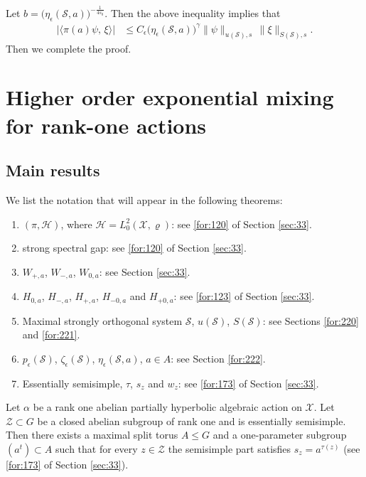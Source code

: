 \documentclass[11 pt]{amsart}
\newcommand{\norm}[1]{\lVert#1\rVert}
\theoremstyle{definition}
\numberwithin{equation}{section}
\begin{document}
Let $b=\big(\eta_\epsilon(\mathcal{S}, a)\big)^{-\frac{1}{4s_0}}$. Then the above inequality implies that
\begin{align*}
 \big|\langle \pi(a)\psi,\, \xi\rangle\big|&\leq C_\epsilon \big(\eta_\epsilon(\mathcal{S}, a)\big)^\gamma \norm{\psi}_{u(\mathcal{S}),s}\,\big\|\xi\big\|_{S(\mathcal{S}),s}.
\end{align*}
Then we complete the proof.






\section{Higher order exponential mixing for rank-one actions}



\subsection{Main results} We list  the notation that will appear in the following theorems:
\begin{enumerate}




  \item $(\pi, \mathcal{H})$, where  $\mathcal H=L_0^2(\mathcal X,\varrho)$:  see \eqref{for:120} of Section \ref{sec:33}.

\item strong spectral gap: see \eqref{for:120} of Section \ref{sec:33}.

\item $W_{+,a}$, $W_{-,a}$, $W_{0,a}$: see Section \ref{sec:33}.

\item $H_{0,a}$, $H_{-,a}$, $H_{+,a}$, $H_{-0,a}$ and $H_{+0,a}$: see \eqref{for:123} of Section \ref{sec:33}.


  \item Maximal strongly orthogonal system $\mathcal{S}$,  $u(\mathcal{S})$, $S(\mathcal{S})$: see Sections \ref{for:220} and \ref{for:221}.
  \item $p_{\epsilon}(\mathcal{S})$, $\zeta_{\epsilon}(\mathcal{S})$, $\eta_\epsilon(\mathcal{S}, a)$, $a\in A$: see Section \ref{for:222}.

  \item Essentially semisimple,  $\tau$, $s_z$ and $w_z$: see  \eqref{for:173} of Section \ref{sec:33}.





\end{enumerate}
Let $\alpha$ be a rank one abelian partially hyperbolic algebraic action on $\mathcal{X}$. Let $\mathcal Z\subset G$ be a closed abelian subgroup of rank one and is essentially semisimple.
Then there exists a maximal split torus $A\le G$ and a one-parameter subgroup $(a^t)\subset A$
such that for every $z\in\mathcal Z$ the semisimple part satisfies $s_z=a^{\tau(z)}$ (see  \eqref{for:173} of Section \ref{sec:33}).
\end{document}
